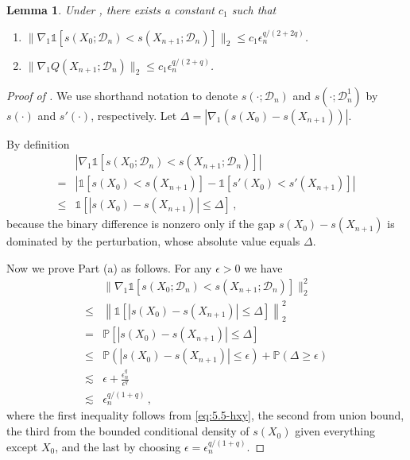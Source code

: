 \documentclass[11pt]{article}
\theoremstyle{plain}
\newtheorem{lemma}[theorem]{Lemma}
\newcommand{\D}{{\mathcal{D}}}
\begin{document}
\begin{lemma}
    \label{lem:5.5-stab-transfer}
    Under , there exists a constant $c_1$ such that 
    \begin{enumerate}
        \item [(a)] $\|\nabla_1\mathds{1}[s(X_0;\D_n)<s(X_{n+1};\D_n)]\|_2\le c_1 \epsilon_n^{q/(2+2q)}$.
        \item [(b)]     $\|\nabla_1 Q(X_{n+1};\D_n)\|_2\le c_1\epsilon_n^{q/(2+q)}$.
    \end{enumerate}
\end{lemma}
\begin{proof}[Proof of ]
We use shorthand notation to denote $s(\cdot;\D_n)$ and $s(\cdot;\D_n^1)$ by
$s(\cdot)$ and $s'(\cdot)$, respectively.  Let $\Delta=|\nabla_1(s(X_0)-s(X_{n+1}))|$.

By definition
\begin{align}
    &\left|\nabla_1\mathds{1}[s(X_0;\D_n)<s(X_{n+1};\D_n)]\right|\nonumber\\
    =& \left|\mathds{1}[s(X_0)<s(X_{n+1})]-\mathds{1}[s'(X_0)<s'(X_{n+1})]\right|\nonumber\\
    \le & \mathds{1}\left[|s(X_0)-s(X_{n+1})|\le \Delta\right]\,,\label{eq:5.5-hxy}
\end{align}
because the binary difference is nonzero only if the
gap $s(X_0)-s(X_{n+1})$ is dominated by the perturbation, whose absolute value equals $\Delta$.

Now we prove Part (a) as follows.
For any $\epsilon>0$ we have
\begin{align*}
  &  \|\nabla_1\mathds{1}[s(X_0;\D_n)<s(X_{n+1};\D_n)]\|_2^2\\
  \le & \left\|\mathds{1}\left[|s(X_0)-s(X_{n+1})|\le \Delta\right]\right\|_2^2\\
  = & \mathbb P\left[|s(X_0)-s(X_{n+1})|\le \Delta\right]\\
  \le &\mathbb P(|s(X_0)-s(X_{n+1})|\le \epsilon)+\mathbb P(\Delta\ge \epsilon)\\
  \lesssim & \epsilon + \frac{\epsilon_n^q}{\epsilon^q}\\
  \lesssim &\epsilon_n^{q/(1+q)}\,,
\end{align*}
where the first inequality follows from \eqref{eq:5.5-hxy}, the second from union bound, the third from the bounded conditional density of $s(X_0)$ given everything except $X_0$, and the last by choosing $\epsilon=\epsilon_n^{q/(1+q)}$.


\end{proof}
\end{document}
